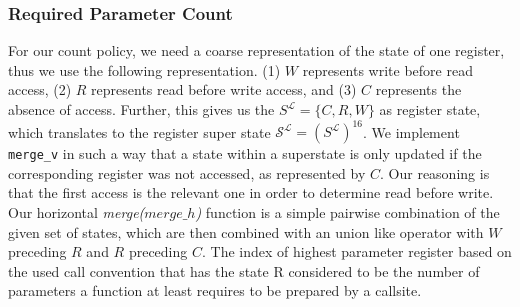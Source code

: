 \subsubsection{Required Parameter Count} 
For our {count} policy, we need a coarse representation of the state of one register, thus we use the following representation.
(1) $W$ represents write before read access, 
(2) $R$ represents read before write access, and 
(3) $C$ represents the absence of access. 
Further, this gives us the $S^\mathcal{L} = \{ C, R, W \}$ as register state, which translates to the register super state $\mathcal{S}^\mathcal{L} = (S^\mathcal{L})^{16}$. 
We implement \texttt{merge\_v} in such a way that a state within a superstate is only updated if the corresponding register was not accessed, as represented by $C$. 
Our reasoning is that the first access is the relevant one in order to determine read before write.
Our horizontal \textit{merge($merge\_h$)} function is a simple pairwise combination of the given set of states, which are then combined with an union like operator with $W$ preceding $R$ and $R$ preceding $C$.
The index of highest parameter register based on the used call convention that has the state R considered to be the number of parameters a function at least requires to be prepared by a callsite.

%
%
%
%

